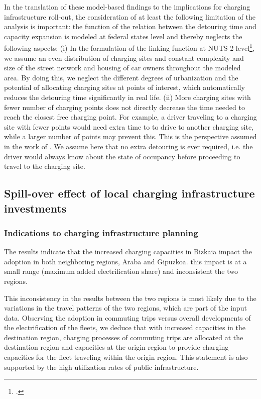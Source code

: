 \documentclass[preprint,review,11pt, authoryear]{elsarticle}
\begin{document}
     In the translation of these model-based findings to the implications for charging infrastructure roll-out, the consideration of at least the following limitation of the analysis is important: the function of the relation between the detouring time and capacity expansion is modeled at federal states level and thereby neglects the following aspects: (i) In the formulation of the linking function at NUTS-2 level\footnote{.}, we assume an even distribution of charging sites and constant complexity and size of the street network and housing of car owners throughout the modeled area. By doing this, we neglect the different degrees of urbanization and the potential of allocating charging sites at points of interest, which automatically reduces the detouring time significantly in real life.  (ii) More charging sites with fewer number of charging points does not directly decrease the time needed to reach the closest free charging point. For example, a driver traveling to a charging site with fewer points would need extra time to  to drive to another charging site, while a larger number of points may prevent this. This is the perspective assumed in the work of \cite{WOLBERTUS2021262}. We assume here that no extra detouring is ever required, i.e.\added{,} the driver would always know about the state of occupancy before proceeding to travel to the charging site.

        \subsection{Spill-over effect of local charging infrastructure investments}
    \subsubsection{Indications to charging infrastructure planning}
    The results indicate that the increased charging capacities in Bizkaia impact the adoption in both neighboring regions, Araba and Gipuzkoa.  this impact is at a small range (maximum  added electrification share) and inconsistent  the two regions. 
    
    This inconsistency in the results between the two regions is most likely due to the variations in the travel patterns of the two regions, which are part of the input data. Observing the adoption in commuting trips versus overall developments of the electrification of the fleets, we deduce that with increased capacities in the destination region, charging processes of commuting trips are allocated at the destination region and  capacities at the origin region to provide charging capacities for the fleet traveling within the origin region. This statement is also supported by the high utilization rates of public infrastructure.
\end{document}
